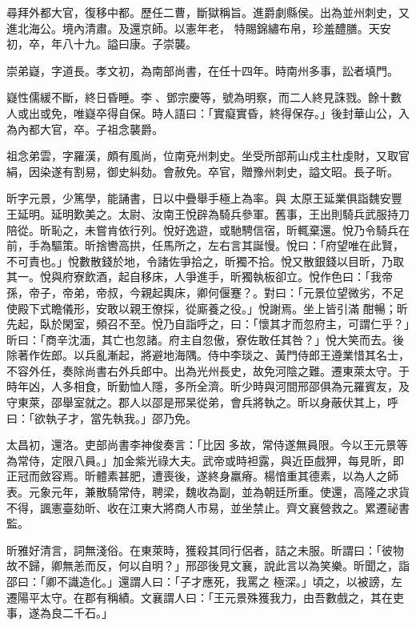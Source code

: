 \begin{pinyinscope}
 尋拜外都大官，復移中都。歷任二曹，斷獄稱旨。進爵劇縣侯。出為並州刺史，又進北海公。境內清肅。及還京師。以憲年老，
 特賜錦繡布帛，珍羞醴膳。天安初，卒，年八十九。謚曰康。子崇襲。



 崇弟嶷，字道長。孝文初，為南部尚書，在任十四年。時南州多事，訟者填門。



 嶷性儒緩不斷，終日昏睡。李、鄧宗慶等，號為明察，而二人終見誅戮。餘十數人或出或免，唯嶷卒得自保。時人語曰：「實癡實昏，終得保存。」後封華山公，入為內都大官，卒。子祖念襲爵。



 祖念弟雲，字羅漢，頗有風尚，位南兗州刺史。坐受所部荊山戍主杜虔財，又取官絹，因染遂有割易，御史糾劾。會赦免。卒官，贈豫州刺史，謚文昭。長子昕。



 昕字元景，少篤學，能誦書，日以中疊舉手極上為率。與
 太原王延業俱詣魏安豐王延明。延明歎美之。太尉、汝南王悅辟為騎兵參軍。舊事，王出則騎兵武服持刀陪從。昕恥之，未嘗肯依行列。悅好逸遊，或馳騁信宿，昕輒棄還。悅乃令騎兵在前，手為驅策。昕捨轡高拱，任馬所之，左右言其誕慢。悅曰：「府望唯在此賢，不可責也。」悅數散錢於地，令諸佐爭拾之，昕獨不拾。悅又散銀錢以目昕，乃取其一。悅與府寮飲酒，起自移床，人爭進手，昕獨執板卻立。悅作色曰：「我帝孫，帝子，帝弟，帝叔，今親起輿床，卿何偃蹇？。對曰：「元景位望微劣，不足使殿下式瞻儀形，安敢以親王僚採，從廝養之役。」悅謝焉。坐上皆引滿
 酣暢；昕先起，臥於閑室，頻召不至。悅乃自詣呼之，曰：「懷其才而忽府主，可謂仁乎？」昕曰：「商辛沈湎，其亡也忽諸。府主自忽傲，寮佐敢任其咎？」悅大笑而去。後除著作佐郎。以兵亂漸起，將避地海隅。侍中李琰之、黃門侍郎王遵業惜其名士，不容外任，奏除尚書右外兵郎中。出為光州長史，故免河陰之難。遷東萊太守。于時年凶，人多相食，昕勤恤人隱，多所全濟。昕少時與河間邢邵俱為元羅賓友，及守東萊，邵舉室就之。郡人以邵是邢杲從弟，會兵將執之。昕以身蔽伏其上，呼曰：「欲執子才，當先執我。」邵乃免。



 太昌初，還洛。吏部尚書李神俊奏言：「比因
 多故，常侍遂無員限。今以王元景等為常侍，定限八員。」加金紫光祿大夫。武帝或時袒露，與近臣戲狎，每見昕，即正冠而斂容焉。昕體素甚肥，遭喪後，遂終身羸瘠。楊愔重其德素，以為人之師表。元象元年，兼散騎常侍，聘梁，魏收為副，並為朝廷所重。使還，高隆之求貨不得，諷憲臺劾昕、收在江東大將商人市易，並坐禁止。齊文襄營救之。累遷祕書監。



 昕雅好清言，詞無淺俗。在東萊時，獲殺其同行侶者，詰之未服。昕謂曰：「彼物故不歸，卿無恙而反，何以自明？」邢邵後見文襄，說此言以為笑樂。昕聞之，詣邵曰：「卿不識造化。」還謂人曰：「子才應死，我罵之
 極深。」頃之，以被謗，左遷陽平太守。在郡有稱績。文襄謂人曰：「王元景殊獲我力，由吾數戲之，其在吏事，遂為良二千石。」




\end{pinyinscope}
